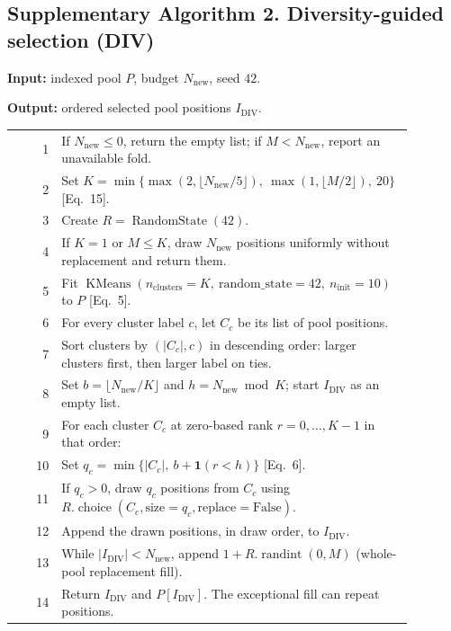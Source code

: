 \documentclass[10pt,a4paper]{article}
\begin{document}
\clearpage
\subsection*{Supplementary Algorithm 2. Diversity-guided selection (DIV)}
\noindent\textbf{Input:} indexed pool $P$, budget $N_{\mathrm{new}}$, seed $42$.\par
\noindent\textbf{Output:} ordered selected pool positions $I_{\mathrm{DIV}}$.\par\smallskip
\noindent\begin{tabular}{@{}r@{\hspace{1em}}p{0.88\linewidth}@{}}
1 & If $N_{\mathrm{new}}\leq0$, return the empty list; if $M<N_{\mathrm{new}}$, report an unavailable fold.\\[2pt]
2 & Set $K=\min\{\max(2,\lfloor N_{\mathrm{new}}/5\rfloor),\ \max(1,\lfloor M/2\rfloor),\ 20\}$ [Eq.~15].\\[2pt]
3 & Create $R=\operatorname{RandomState}(42)$.\\[2pt]
4 & If $K=1$ or $M\leq K$, draw $N_{\mathrm{new}}$ positions uniformly without replacement and return them.\\[2pt]
5 & Fit $\operatorname{KMeans}(n_{\mathrm{clusters}}=K,\ \mathrm{random\_state}=42,\ n_{\mathrm{init}}=10)$ to $P$ [Eq.~5].\\[2pt]
6 & For every cluster label $c$, let $C_c$ be its list of pool positions.\\[2pt]
7 & Sort clusters by $(|C_c|,c)$ in descending order: larger clusters first, then larger label on ties.\\[2pt]
8 & Set $b=\lfloor N_{\mathrm{new}}/K\rfloor$ and $h=N_{\mathrm{new}}\bmod K$; start $I_{\mathrm{DIV}}$ as an empty list.\\[2pt]
9 & For each cluster $C_c$ at zero-based rank $r=0,\ldots,K-1$ in that order:\\[2pt]
10 & \quad Set $q_c=\min\{|C_c|,\ b+\mathbf{1}(r<h)\}$ [Eq.~6].\\[2pt]
11 & \quad If $q_c>0$, draw $q_c$ positions from $C_c$ using $R.\operatorname{choice}(C_c,\mathrm{size}=q_c,\mathrm{replace}=\mathrm{False})$.\\[2pt]
12 & \quad Append the drawn positions, in draw order, to $I_{\mathrm{DIV}}$.\\[2pt]
13 & While $|I_{\mathrm{DIV}}|<N_{\mathrm{new}}$, append $1+R.\operatorname{randint}(0,M)$ (whole-pool replacement fill).\\[2pt]
14 & Return $I_{\mathrm{DIV}}$ and $P[I_{\mathrm{DIV}}]$. The exceptional fill can repeat positions.\\
\end{tabular}
\end{document}
